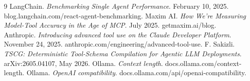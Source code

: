 \documentclass[10pt]{article}
\begin{document}
{\small\setlength{\itemsep}{0pt}\begin{thebibliography}{9}
 LangChain. \textit{Benchmarking Single Agent Performance}. February 10, 2025. blog.langchain.com/react-agent-benchmarking.
 Maxim AI. \textit{How We're Measuring Model-Tool Accuracy in the Age of MCP}. July 2025. getmaxim.ai/blog.
 Anthropic. \textit{Introducing advanced tool use on the Claude Developer Platform}. November 24, 2025. anthropic.com/engineering/advanced-tool-use.
 F. Sakizli. \textit{TSCG: Deterministic Tool-Schema Compilation for Agentic LLM Deployments}. arXiv:2605.04107, May 2026.
 Ollama. \textit{Context length}. docs.ollama.com/context-length.
 Ollama. \textit{OpenAI compatibility}. docs.ollama.com/api/openai-compatibility.
\end{thebibliography}}
\end{document}
